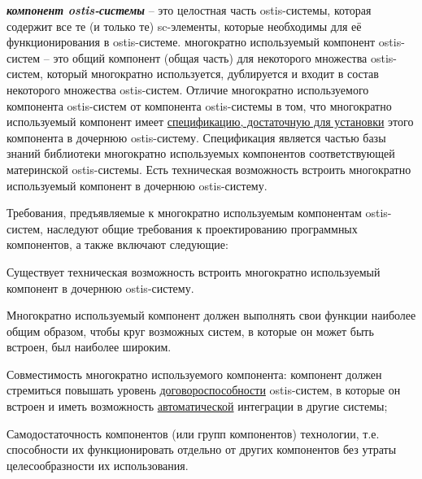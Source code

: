 \begin{SCn}
\end{SCn}

\textit{\textbf{компонент ostis-системы}} -- это целостная часть ostis-системы, которая содержит все те (и только те) sc-элементы, которые необходимы для её функционирования в ostis-системе. многократно используемый компонент ostis-систем -- это общий компонент (общая часть) для некоторого множества ostis-систем, который многократно используется, дублируется и входит в состав некоторого множества ostis-систем.
Отличие многократно используемого компонента ostis-систем от компонента ostis-системы в том, что многократно используемый компонент имеет \underline{спецификацию, достаточную для установки} этого компонента в дочернюю ostis-систему. Спецификация является частью базы знаний библиотеки многократно используемых компонентов соответствующей материнской ostis-системы. Есть техническая возможность встроить многократно используемый компонент в дочернюю ostis-систему.

Требования, предъявляемые к многократно используемым компонентам ostis-систем, наследуют общие требования к проектированию программных компонентов, а также включают следующие:
\begin{textitemize}
	\item{Существует техническая возможность встроить многократно используемый компонент в дочернюю ostis-систему.}
	\item{Многократно используемый компонент должен выполнять свои функции наиболее общим образом, чтобы круг возможных систем, в которые он может быть встроен, был наиболее широким.}
	\item{Совместимость многократно используемого компонента: компонент должен стремиться повышать уровень \underline{договороспособности} ostis-систем, в которые он встроен и иметь возможность \underline{автоматической} интеграции в другие системы;}
	\item{Самодостаточность компонентов (или групп компонентов) технологии, т.е. способности их функционировать отдельно от других компонентов без утраты целесообразности их использования.}
\end{textitemize}

